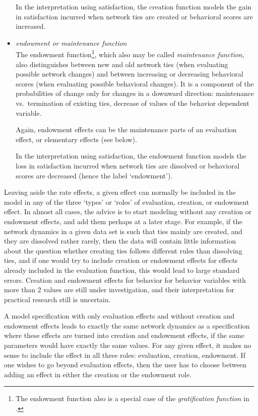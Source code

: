 \documentclass[a4paper,fleqn,11pt]{article}
\newcommand{\+}{\, + \,}
\begin{document}
\begin{itemize}
In the interpretation using satisfaction, the creation function
models the gain in satisfaction incurred when network ties are created
or behavioral scores are increased.

\item {\em endowment or maintenance function}\\
The endowment function\footnote{The endowment function also is
a special case of the {\it gratification function} in \citet{Snijders01}.},
which also may be called \emph{maintenance function},
also distinguishes between new and old network
ties (when evaluating possible network changes) and between
increasing or decreasing behavioral scores (when evaluating
possible behavioral changes).
It is a component of the probabilities of change only for changes in
a downward direction: maintenance vs.\ termination of existing ties,
decrease of values of the behavior dependent variable.

Again, endowment effects can be the maintenance parts of an evaluation effect,
or elementary effects (see below).

In the interpretation using satisfaction, the endowment function
models the loss in satisfaction incurred when network ties are dissolved or
behavioral scores are decreased (hence the label `endowment').
\end{itemize}

Leaving aside the rate effects, a given effect can normally be included
in the model in any of the three `types' or `roles' of
evaluation, creation, or endowment effect.
In almost all cases, the advice is to
start modeling without any creation or endowment effects,
and add them perhaps at a later stage.
For example, if the network dynamics in a given data set is such
that ties mainly are created, and they are dissolved rather rarely,
then the data will contain little information about the question whether
creating ties follows different rules than dissolving ties,
and if one would try to include   creation or endowment effects
for effects already included in the evaluation function,
this would lead to large standard errors.
Creation and endowment effects for behavior for behavior variables with more
than 2 values are still under investigation, and their interpretation
for practical research still is uncertain.

A model specification with only evaluation effects and without creation and
endowment effects leads to exactly the same network dynamics as a specification
where these effects are turned into creation and endowment effects,
if the same parameters would have exactly the same values.
For any given effect, it makes no sense to include the effect
in all three roles: evaluation, creation, endowment.
If one wishes to go beyond evaluation effects, then the user has to choose
between adding an effect in either the creation or the endowment role.
\end{document}
